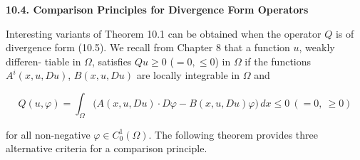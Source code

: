 \bigskip

\noindent\textbf{10.4. Comparison Principles for Divergence Form Operators}

\medskip

Interesting variants of Theorem 10.1 can be obtained when the operator $Q$ is of
divergence form (10.5). We recall from Chapter 8 that a function $u$, weakly differen-
tiable in $\Omega$, satisfies $Qu\ge 0$ ($=0,\le 0$) in $\Omega$ if the functions $A^i(x,u,Du)$, $B(x,u,Du)$
are locally integrable in $\Omega$ and

\begin{equation}
\tag{10.21}
Q(u,\varphi)=\int_{\Omega}\bigl(A(x,u,Du)\cdot D\varphi-B(x,u,Du)\varphi\bigr)\,dx\le 0\ (=0,\ \ge 0)
\end{equation}

for all non-negative $\varphi\in C_0^1(\Omega)$. The following theorem provides three alternative
criteria for a comparison principle.

\medskip

